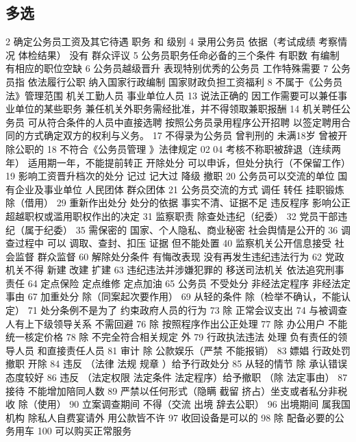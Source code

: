 \documentclass[cyan]{elegantnote}
\begin{document}
\subsection{多选}
\label{sec:orgb139bf8}
2 确定公务员工资及其它待遇
职务 和 级别
4 录用公务员 依据（考试成绩 考察情况 体检结果）
没有 群众评议
5 公务员职务任命必备的三个条件
有职数 有编制 有相应的职位空缺
6 公务员越级晋升
表现特别优秀的公务员 工作特殊需要
7 公务员指
依法履行公职
纳入国家行政编制
国家财政负担工资福利
8 不属于《公务员法》管理范围
机关工勤人员
事业单位人员
13 说法正确的
因工作需要可以兼任事业单位的某些职务
兼任机关外职务需经批准，并不得领取兼职报酬
14 机关聘任公务员
可从符合条件的人员中直接选聘
按照公务员录用程序公开招聘
以签定聘用合同的方式确定双方的权利与义务。
17 不得录为公务员
曾判刑的 未满18岁 曾被开除公职的
18 不符合《公务员管理 》法律规定
02 04 考核不称职被辞退（连续两年）
适用期一年，不能提前转正
开除处分 可以申诉，但处分执行（不保留工作）
19 影响工资晋升档次的处分
记过 记大过 降级 撤职
20 公务员可以交流的单位
国有企业及事业单位
人民团体
群众团体
21 公务员交流的方式
调任 转任 挂职锻炼 除（借用）
29 重新作出处分
处分的依据 事实不清、证据不足
违反程序 影响公正
超越职权或滥用职权作出的决定
31 监察职责
除查处违纪（纪委）
32 党员干部违纪（属于纪委）
35 需保密的
国家、个人隐私、商业秘密
社会舆情是公开的
36 调查过程中 可以
调取、查封、扣压 证据
但不能处置
40 监察机关公开信息接受
社会监督 群众监督
60 解除处分条件
有悔改表现
没有再发生违纪违法行为
62 党政机关不得
新建 改建 扩建
63 违纪违法并涉嫌犯罪的
移送司法机关
依法追究刑事责任
64 定点保险 定点维修 定点加油
65 公务员 不受处分
非经法定程序
非经法定事由
67 加重处分
除（同案起次要作用）
69 从轻的条件
除（检举不确认，不能认定）
71 处分条例不是为了
约束政府人员的行为
73 除 正常会议支出
74 与被调查人有上下级领导关系 不需回避
76 除 按照程序作出公正处理
77 除 办公用户
不能统一核定价格
78 除 不完全符合相关规定 外
79 行政执法违法 处理
负有责任的领导人员
和直接责任人员
81 审计
除 公款娱乐（严禁 不能报销）
83 嫖娼 行政处罚
撤职 开除
84 违反 （法律 法规 规章 ）给予行政处分
85 从轻的情节
除 承认错误态度较好
86 违反 （法定权限 法定条件 法定程序）给予撤职
（除 法定事由）
87 接待 不能增加陪同人数
89 严禁以任何形式（隐瞒 截留 挤占）坐支或者私分非税收
除（使用）
90 立案调查期间 不得（交流 出境 辞去公职）
96 出境期间 属我国机构 除私人自费宴请外 用公款皆不许
97 收回设备是可以的
98 除 配备必要的公务用车
100 可以购买正常服务
\end{document}
